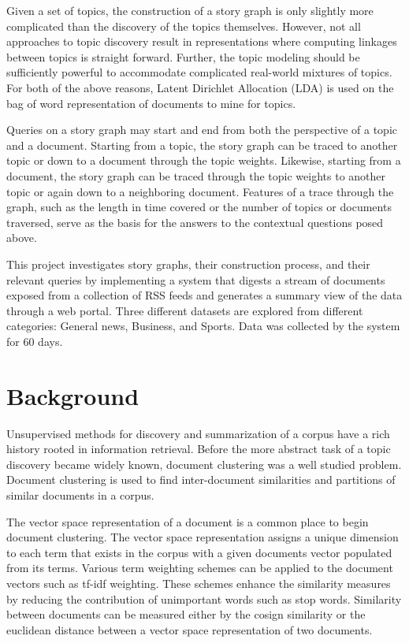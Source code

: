 \documentclass[10pt,twocolumn]{article}
\begin{document}
Given a set of topics, the construction of a story graph is only slightly more complicated than the discovery of the topics themselves.  However, not all approaches to topic discovery result in representations where computing linkages between topics is straight forward.  Further, the topic modeling should be sufficiently powerful to accommodate complicated real-world mixtures of topics.  For both of the above reasons, Latent Dirichlet Allocation (LDA) is used on the bag of word representation of documents to mine for topics. 

Queries on a story graph may start and end from both the perspective of a topic and a document.  Starting from a topic, the story graph can be traced to another topic or down to a document through the topic weights.  Likewise, starting from a document, the story graph can be traced through the topic weights to another topic or again down to a neighboring document.  Features of a trace through the graph, such as the length in time covered or the number of topics or documents traversed, serve as the basis for the answers to the contextual questions posed above.

This project investigates story graphs, their construction process, and their relevant queries by implementing a system that digests a stream of documents exposed from a collection of RSS feeds and generates a summary view of the data through a web portal.  Three different datasets are explored from different categories: General news, Business, and Sports.  Data was collected by the system for 60 days.

\section {Background}
Unsupervised methods for discovery and summarization of a corpus have a rich history rooted in information retrieval.  Before the more abstract task of a topic discovery became widely known, document clustering was a well studied problem.  Document clustering is used to find inter-document similarities and partitions of similar documents in a corpus.   

The vector space representation of a document is a common place to begin document clustering.  The vector space representation assigns a unique dimension to each term that exists in the corpus with a given documents vector populated from its terms.  Various term weighting schemes can be applied to the document vectors such as tf-idf weighting.  These schemes enhance the similarity measures by reducing the contribution of unimportant words such as stop words.  Similarity between documents can be measured either by the cosign similarity or the euclidean distance between a vector space representation of two documents.
\end{document}
